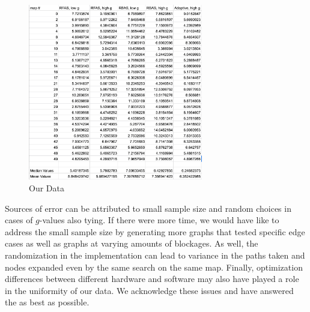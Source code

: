 \documentclass[a4paper,12pt]{article}
\begin{document}
\begin{figure}[!htbp]
	\includegraphics[angle=0, origin=c, width =  0.68\textwidth]{data1.jpg}
	\caption{Our Data}
\end{figure}
\FloatBarrier

Sources of error can be attributed to small sample size and random choices in cases of $g$-values also tying. If there were more time, we would have like to address the small sample size by generating more graphs that tested specific edge cases as well as graphs at varying amounts of blockages. As well, the randomization in the implementation can lead to variance in the paths taken and nodes expanded even by the same search on the same map. Finally, optimization differences between different hardware and software may also have played a role in the uniformity of our data. We acknowledge these issues and have answered the as best as possible. 
\end{document}
